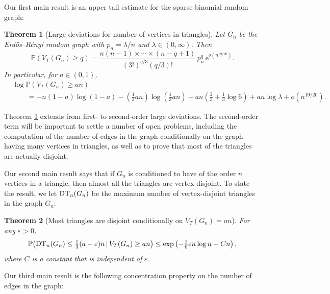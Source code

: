 \documentclass[bj,authoryear,noshowframe]{imsart}
\numberwithin{equation}{section}
\theoremstyle{plain}
\newtheorem{thm}{Theorem}[section]
\theoremstyle{definition}
\newcommand{\erdos}{Erd\H{o}s--R\'enyi random graph}
\newcommand{\e}{{\mathrm e}}
\newcommand{\DT}{{\rm DT}}
\begin{document}
Our first main result is an upper tail estimate for the sparse binomial random graph:

\begin{thm}[Large deviations for number of vertices in triangles]
\label{thm:ldp_vertices_in_triangle}
Let $G_n$ be the \erdos{} with $p_n=\lambda/n$ and $\lambda \in (0,\infty)$. Then
	\begin{equation}
	\label{eqn:monfeb21426pm}
	\mathbb{P}(V_{T}(G_n)  \geq q) 
	= \frac{n(n-1) \times\cdots\times (n-q+1)} {(3!)^{q/3}(q/3)!}\, p_n^q\, \e^{o(n^{19/20})}.
	\end{equation}
In particular, for $a \in (0,1)$, 
	\begin{equation}
	\label{eqn:monfeb21427pm}
	\begin{aligned}
	&\log{\mathbb{P}(V_{T}(G_n)  \geq an)}\\ 
	&\qquad = -n(1-a) \log(1-a) - (\tfrac13 an) \log(\tfrac13 an) - an (\tfrac23  +\tfrac13 \log{6})
	+ an \log{\lambda} + o(n^{19/20}).
	\end{aligned}
	\end{equation}
\end{thm}

\noindent
Theorem \ref{thm:ldp_vertices_in_triangle} extends \cite[Theorem 1.8]{ChaHofHol21} from first- to second-order large deviations. The second-order term will be important to settle a number of open problems, including the computation of the number of edges in the graph conditionally on the graph having many vertices in triangles, as well as to prove that most of the triangles are actually disjoint. 

Our second main result says that if $G_n$ is conditioned to have of the order $n$ vertices in a triangle, then almost all the triangles are vertex disjoint. To state the result, we let $\DT_n(G_n)$ be the maximum number of vertex-disjoint triangles in the graph $G_n$:

\begin{thm}[Most triangles are disjoint conditionally on $V_T(G_n)=an$]
\label{structure:disjoint triangles}
For any $\varepsilon>0$,
	\begin{equation}
	\label{eqn:thumar301158am}
	\mathbb{P}\big(\DT_n(G_n)\leq \tfrac13(a-\varepsilon)n \,|\, V_T(G_n)\geq an\big) 
	\leq  \exp\left(-\tfrac16\varepsilon n\log{n} + Cn\right),
	\end{equation} 
where $C$ is a constant that is independent of $\varepsilon$.
\end{thm}

Our third main result is the following concentration property on the number of edges in the graph:
\end{document}
